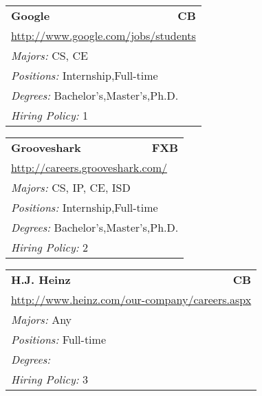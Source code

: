 \documentclass[twoside]{article}
\begin{document}
\begin{center}
\begin{multicols}{3}
\begin{FlushLeft}
\begin{minipage}{.9\columnwidth}
\end{minipage}
 
\begin{minipage}{.9\columnwidth}\begin{tabularx}{.95\columnwidth}{Xr}
                 {\Large\bf Google} & {\Large\bf CB}\\
    \multicolumn{2}{p{.95\columnwidth}}{\url{http://www.google.com/jobs/students}}\\
    \multicolumn{2}{p{.95\columnwidth}}{\emph{Majors:} CS, CE}\\
    \multicolumn{2}{p{.95\columnwidth}}{\emph{Positions:} Internship,Full-time}\\
    \multicolumn{2}{p{.95\columnwidth}}{\emph{Degrees:} Bachelor's,Master's,Ph.D.}\\
    \multicolumn{2}{p{.95\columnwidth}}{\emph{Hiring Policy:} 1}\\
    \end{tabularx}
    
\end{minipage}
 
\begin{minipage}{.9\columnwidth}\begin{tabularx}{.95\columnwidth}{Xr}
                 {\Large\bf Grooveshark} & {\Large\bf FXB}\\
    \multicolumn{2}{p{.95\columnwidth}}{\url{http://careers.grooveshark.com/}}\\
    \multicolumn{2}{p{.95\columnwidth}}{\emph{Majors:} CS, IP, CE, ISD}\\
    \multicolumn{2}{p{.95\columnwidth}}{\emph{Positions:} Internship,Full-time}\\
    \multicolumn{2}{p{.95\columnwidth}}{\emph{Degrees:} Bachelor's,Master's,Ph.D.}\\
    \multicolumn{2}{p{.95\columnwidth}}{\emph{Hiring Policy:} 2}\\
    \end{tabularx}
    
\end{minipage}
 
\begin{minipage}{.9\columnwidth}\begin{tabularx}{.95\columnwidth}{Xr}
                 {\Large\bf H.J. Heinz} & {\Large\bf CB}\\
    \multicolumn{2}{p{.95\columnwidth}}{\url{http://www.heinz.com/our-company/careers.aspx}}\\
    \multicolumn{2}{p{.95\columnwidth}}{\emph{Majors:} Any}\\
    \multicolumn{2}{p{.95\columnwidth}}{\emph{Positions:} Full-time}\\
    \multicolumn{2}{p{.95\columnwidth}}{\emph{Degrees:} }\\
    \multicolumn{2}{p{.95\columnwidth}}{\emph{Hiring Policy:} 3}\\
    \end{tabularx}
    

\end{minipage}
\end{FlushLeft}
\end{multicols}
\end{center}
\end{document}

